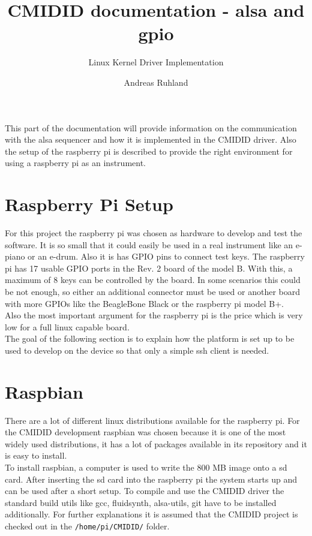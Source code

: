 \documentclass[paper=a4,fontsize=11pt,twocolumn,pagesize,bibtotoc]{scrartcl}
\title{CMIDID documentation - alsa and gpio }
\subtitle{Linux Kernel Driver Implementation}
\author{Andreas Ruhland}
\begin{document}
	\maketitle
	
This part of the documentation will provide information on the communication with the alsa sequencer and how it is implemented in the CMIDID driver. Also the setup of the raspberry pi is described to provide the right environment for using a  raspberry pi as an instrument.
\section{Raspberry Pi Setup}
For this project the raspberry pi was chosen as hardware to develop and test the software. It is so small  that it could easily be used in a real instrument like an e-piano or an e-drum. Also it is has GPIO pins to connect test keys. The raspberry pi has 17 usable GPIO ports in the Rev. 2 board of the model B. With this, a maximum of 8 keys can be controlled by the board. In some scenarios this could be not enough, so either an additional connector must be used or another board with more GPIOs like the BeagleBone Black or the raspberry pi model B+.\\
Also the most important argument for the raspberry pi is the price which is very low for a full linux capable board. 
\\
The goal of the following section is to explain how the platform is set up to be used to develop on the device so that only a simple ssh client is needed.
\cite{gpiopins}
\section{Raspbian}
There are a lot of different linux distributions available for the raspberry pi. For the CMIDID development raspbian was chosen because it is one of the most widely used distributions, it has a lot of packages available in its repository and it is easy to install. \\
To install raspbian, a computer is used to write the 800 MB image onto a sd card. After inserting the sd card into the raspberry pi the system starts up and can be used after a short setup. To compile and use the CMIDID driver the standard build utils like gcc, fluidsynth, alsa-utils, git have to be installed additionally. For further explanations it is assumed that the CMIDID project is checked out in the \texttt{/home/pi/CMIDID/} folder.
\end{document}

